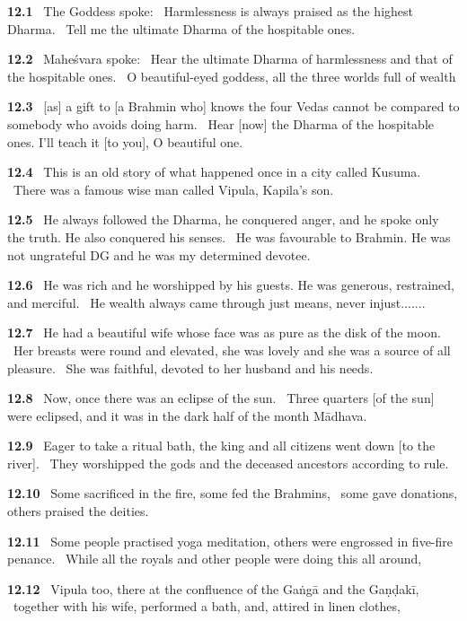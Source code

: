 \documentclass{article}
\begin{document}
\textbf{12.1}%
\ The Goddess spoke:%
\ Harmlessness is always praised as the highest Dharma.%
\ Tell me the ultimate Dharma of the hospitable ones.%


\textbf{12.2}%
\ Maheśvara spoke:%
\ Hear the ultimate Dharma of harmlessness and that of the hospitable ones.%
\ O beautiful-eyed goddess, all the three worlds full of wealth%


\textbf{12.3}%
\ [as] a gift to [a Brahmin who] knows the four Vedas cannot be compared to somebody who avoids doing harm.%
\ Hear [now] the Dharma of the hospitable ones. I'll teach it [to you], O beautiful one.%


\textbf{12.4}%
\ This is an old story of what happened once in a city called Kusuma.%
\ There was a famous wise man called Vipula, Kapila's son.%


\textbf{12.5}%
\ He always followed the Dharma, he conquered anger, and he spoke only the truth. He also conquered his senses.%
\ He was favourable to Brahmin. He was not ungrateful DG and he was my determined devotee.%


\textbf{12.6}%
\ He was rich and he worshipped by his guests. He was generous, restrained, and merciful.%
\ He wealth always came through just means, never injust.......%


\textbf{12.7}%
\ He had a beautiful wife whose face was as pure as the disk of the moon.%
\ Her breasts were round and elevated, she was lovely and she was a source of all pleasure.%
\ She was faithful, devoted to her husband and his needs.%


\textbf{12.8}%
\ Now, once there was an eclipse of the sun.%
\ Three quarters [of the sun] were eclipsed, and it was in the dark half of the month Mādhava.%


\textbf{12.9}%
\ Eager to take a ritual bath, the king and all citizens went down [to the river].%
\ They worshipped the gods and the deceased ancestors according to rule.%


\textbf{12.10}%
\ Some sacrificed in the fire, some fed the Brahmins,%
\ some gave donations, others praised the deities.%


\textbf{12.11}%
\ Some people practised yoga meditation, others were engrossed in five-fire penance.%
\ While all the royals and other people were doing this all around,%


\textbf{12.12}%
\ Vipula too, there at the confluence of the Gaṅgā and the Gaṇḍakī,%
\ together with his wife, performed a bath, and, attired in linen clothes,%
\end{document}
